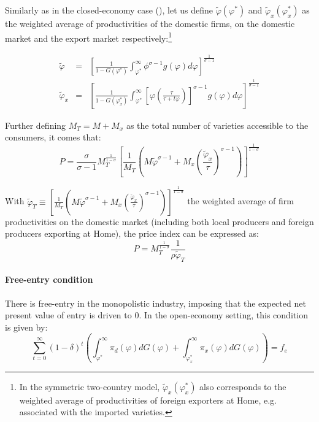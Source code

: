 \documentclass[a4paper,11pt]{article}
\begin{document}
Similarly as in the closed-economy case (\cite{melitz}), let us define $\widetilde{\varphi}(\varphi^\ast)$ and $\widetilde{\varphi}_x(\varphi_x^\ast)$ as the weighted average of productivities of the domestic firms, on the domestic market and the export market respectively:\footnote{In the symmetric two-country model, $\widetilde{\varphi}_x(\varphi_x^\ast)$ also corresponds to the weighted average of productivities of foreign exporters at Home, e.g. associated with the imported varieties.}

\begin{eqnarray}
\widetilde{\varphi} &=& \left[\frac{1}{1-G(\varphi^\ast)}\int_{\varphi^\ast}^\infty \phi^{\sigma-1}g(\varphi)d\varphi   \right]^{\frac{1}{\sigma-1}} \label{eq:def_phitilde}\\
\widetilde{\varphi}_x &=& \left[\frac{1}{1-G(\varphi_x^\ast)}\int_{\varphi^\ast}^\infty \left[\varphi\left(\frac{\tau}{\tau+t \varphi}  \right) \right]^{\sigma-1}g(\varphi)d\varphi   \right]^{\frac{1}{\sigma-1}} \label{eq:def_phitildex}
\end{eqnarray}

Further defining $M_T = M+M_x$ as the total number of varieties accessible to the consumers, it comes that:
$$P = \frac{\sigma}{\sigma-1}M_T^{\frac{1}{1-\sigma}}\left[\frac{1}{M_T}\left(M\widetilde{\varphi}^{\sigma-1} + M_x \left( \frac{\widetilde{\varphi}_x}{\tau} \right)^{\sigma-1} \right)  \right]^{\frac{1}{1-\sigma}}$$

With $\widetilde{\varphi}_T \equiv \left[\frac{1}{M_T}\left(M\widetilde{\varphi}^{\sigma-1} + M_x \left( \frac{\widetilde{\varphi}_x}{\tau} \right)^{\sigma-1} \right)  \right]^{\frac{1}{1-\sigma}}$ the weighted average of firm productivities on the domestic market (including both local producers and foreign producers exporting at Home), the price index can be expressed as:
\begin{equation}
P = M_T^{\frac{1}{1-\sigma}}\frac{1}{\rho \widetilde{\varphi}_T } \label{eq:CPI_vf}
\end{equation}


\paragraph{Free-entry condition} There is free-entry in the monopolistic industry, imposing that the expected net present value of entry is driven to 0. In the open-economy setting, this condition is given by:
\begin{equation*}
  \sum_{t=0}^{\infty}(1-\delta)^t \left(\int_{\varphi^\ast}^{\infty} \pi_d(\varphi )dG(\varphi) + \int_{\varphi_x^\ast}^{\infty} \pi_x(\varphi )dG(\varphi)  \right) = f_e
\end{equation*}
\end{document}
